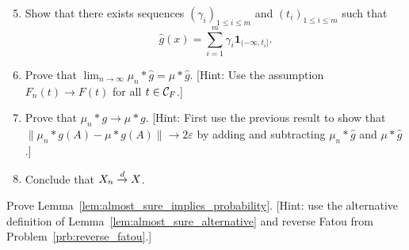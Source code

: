 \begin{problem}
\begin{enumerate}[label={(\alph*)}]
\setcounter{enumi}{4}
\item Show that there exists sequences $(\gamma_i)_{1 \le i \le m}$ and $(t_i)_{1 \le i \le m}$ such that
\[
	\hat{g}(x) = \sum_{i = 1}^m \gamma_i \mathbf{1}_{(-\infty, t_i]}.
\]
\item Prove that $\lim_{n \to \infty} \mu_n \ast \hat{g} = \mu \ast \hat{g}$. [Hint: Use the assumption $F_n(t) \to F(t)$ for all $t \in \mathcal C_F$.]
\item Prove that $\mu_n \ast g \to \mu \ast g$. [Hint: First use the previous result to show that $\|\mu_n \ast g(A) - \mu \ast g(A)\| \to 2\varepsilon$ by adding and subtracting $\mu_n \ast \hat{g}$ and $\mu \ast \hat{g}$.]
\item Conclude that $X_n \stackrel{d}{\rightarrow} X$.
\end{enumerate}
\end{problem}

\begin{problem}\label{prb:almost_sure_implies_probability}
Prove Lemma~\ref{lem:almost_sure_implies_probability}. [Hint: use the alternative definition of Lemma~\ref{lem:almost_sure_alternative} and reverse Fatou from Problem~\ref{prb:reverse_fatou}.]
\end{problem}